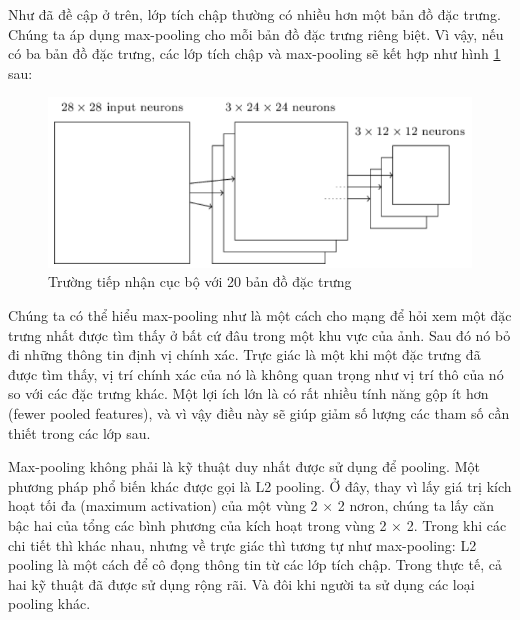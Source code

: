 Như đã đề cập ở trên, lớp tích chập thường có nhiều hơn một bản đồ đặc trưng. Chúng ta áp dụng max-pooling cho mỗi bản đồ đặc trưng riêng biệt. Vì vậy, nếu có ba bản đồ đặc trưng, các lớp tích chập và max-pooling sẽ kết hợp như hình \ref{fig:maxpoolingvoibabandodactrung} sau:
\begin{figure}[H]
	\centering
	\includegraphics[width=0.8\linewidth]{images/maxpoolingvoibabandodactrung.png}
	\caption{Trường tiếp nhận cục bộ với 20 bản đồ đặc trưng}
	\label{fig:maxpoolingvoibabandodactrung}
\end{figure}
Chúng ta có thể hiểu max-pooling như là một cách cho mạng để hỏi xem một đặc trưng nhất được tìm thấy ở bất cứ đâu trong một khu vực của ảnh. Sau đó nó bỏ đi những thông tin định vị chính xác. Trực giác là một khi một đặc trưng đã được tìm thấy, vị trí chính xác của nó là không quan trọng như vị trí thô của nó so với các đặc trưng khác. Một lợi ích lớn là có rất nhiều tính năng gộp ít hơn (fewer pooled features), và vì vậy điều này sẽ giúp giảm số lượng các tham số cần thiết trong các lớp sau.

Max-pooling không phải là kỹ thuật duy nhất được sử dụng để pooling. Một phương pháp phổ biến khác được gọi là L2 pooling. Ở đây, thay vì lấy giá trị kích hoạt tối đa (maximum activation) của một vùng 2 × 2 nơron, chúng ta lấy căn bậc hai của tổng các bình phương của kích hoạt trong vùng 2 × 2. Trong khi các chi tiết thì khác nhau, nhưng về trực giác thì tương tự như max-pooling: L2 pooling là một cách để cô đọng thông tin từ các lớp tích chập. Trong thực tế, cả hai kỹ thuật đã được sử dụng rộng rãi. Và đôi khi người ta sử dụng các loại pooling khác.

